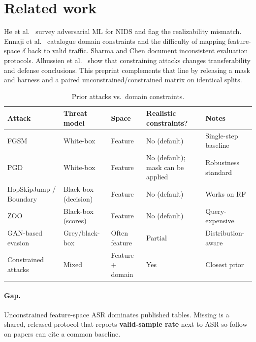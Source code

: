 \documentclass[11pt,a4paper]{article}
\begin{document}
\section{Related work}

He et al.\ \cite{he2023aml} survey adversarial ML for NIDS and flag the realizability mismatch. Ennaji et al.\ \cite{ennaji2024adversarial} catalogue domain constraints and the difficulty of mapping feature-space $\delta$ back to valid traffic. Sharma and Chen \cite{sharma2024systematic} document inconsistent evaluation protocols. Alhussien et al.\ \cite{alhussien2024constraining} show that constraining attacks changes transferability and defense conclusions. This preprint complements that line by releasing a mask and harness and a paired unconstrained/constrained matrix on identical splits.

\begin{table}[t]
\centering
\caption{Prior attacks vs.\ domain constraints.}
\label{tab:related}
\small
\begin{tabular}{p{3.4cm}p{2.4cm}p{1.8cm}p{2.6cm}p{2.4cm}}
\toprule
Attack & Threat model & Space & Realistic constraints? & Notes \\
\midrule
FGSM \cite{goodfellow2015explaining} & White-box & Feature & No (default) & Single-step baseline \\
PGD \cite{madry2018towards} & White-box & Feature & No (default); mask can be applied & Robustness standard \\
HopSkipJump / Boundary & Black-box (decision) & Feature & No (default) & Works on RF \\
ZOO & Black-box (scores) & Feature & No (default) & Query-expensive \\
GAN-based evasion & Grey/black-box & Often feature & Partial & Distribution-aware \\
Constrained attacks \cite{alhussien2024constraining} & Mixed & Feature + domain & Yes & Closest prior \\
\bottomrule
\end{tabular}
\end{table}

\paragraph{Gap.}
Unconstrained feature-space ASR dominates published tables. Missing is a shared, released protocol that reports \textbf{valid-sample rate} next to ASR so follow-on papers can cite a common baseline.
\end{document}
